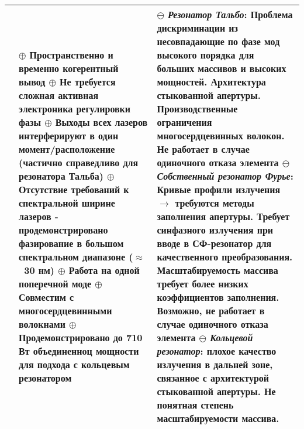 \begin{longtable}[c]{ | p{4cm} | p{6cm} | p{6cm} |}
    &
      $\oplus$ Пространственно и временно когерентный вывод
      \newline$\oplus$ Не требуется сложная активная электроника регулировки фазы
      \newline$\oplus$ Выходы всех лазеров интерферируют в один момент/расположение (частично справедливо для резонатора Тальба)
      \newline$\oplus$ Отсутствие требований к спектральной ширине лазеров - продемонстрировано фазирование в  большом спектральном диапазоне ($\approx$~30 нм)
      \newline$\oplus$ Работа на одной поперечной моде
      \newline$\oplus$ Совместим с многосердцевинными волокнами
      \newline$\oplus$ Продемонстрировано до 710 Вт объединенноц мощности для подхода с кольцевым резонатором
    &
      $\ominus$ \textit{Резонатор Тальбо}: Проблема дискриминации из несовпадающие по фазе мод высокого порядка для больших массивов и высоких мощностей. Архитектура стыкованной апертуры. Производственные ограничения многосердцевинных волокон. Не работает в случае одиночного отказа элемента
      \newline$\ominus$ \textit{Собственный резонатор Фурье}: Кривые профили излучения $\rightarrow$ требуются методы заполнения апертуры. Требует синфазного излучения при вводе в СФ-резонатор для качественного преобразования. Масштабируемость массива требует более низких коэффициентов заполнения. Возможно, не работает в случае одиночного отказа элемента
      \newline$\ominus$ \textit{Кольцевой резонатор}: плохое качество излучения в дальней зоне, связанное с архитектурой стыкованной апертуры. Не понятная степень масштабируемости массива.
    \\
  \hline
\end{longtable}

